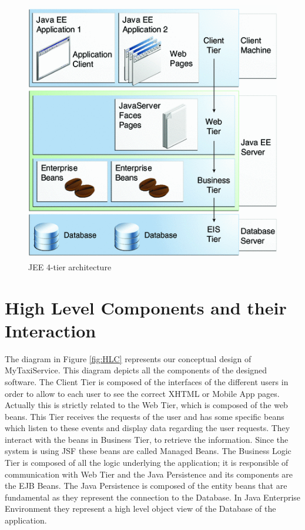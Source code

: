 \begin{figure}[htbp]
\centering
\includegraphics[width=\textwidth]{cpt/img/JavaEEOverview}
\caption{JEE 4-tier architecture}
\end{figure}
\clearpage

\section{High Level Components and their Interaction}
The diagram in Figure \ref{fig:HLC}  represents our conceptual design of MyTaxiService. This diagram depicts all the components of the designed software.
The Client Tier is composed of the interfaces of the different users in order to allow to each user to see the correct XHTML or Mobile App pages. Actually this is strictly related to the Web Tier, which is composed of the web beans. This Tier receives the requests of the user and has some specific beans which listen to these events and display data regarding the user requests. They interact with the beans in Business Tier, to retrieve the information. Since the system is using JSF these beans are called Managed Beans.
The Business Logic Tier is composed of all the logic underlying the application; it is
responsible of communication with Web Tier and the Java Persistence and its components are the EJB Beans.
The Java Persistence is composed of the entity beans that are fundamental as they represent the connection to the Database. In Java Enterprise Environment they represent a high level object view of the Database of the application.

